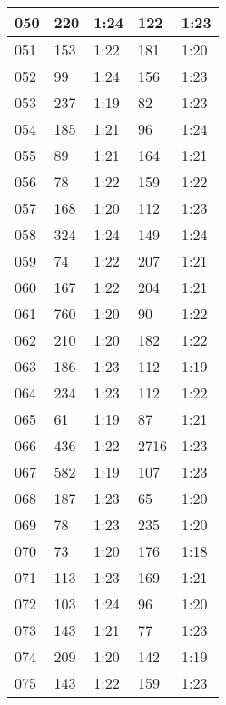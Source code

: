 \begin{center}
\begin{longtable}{|p{2cm}|l|l|l|l|}
050	&   220           &  1:24  &		122     	& 1:23 \\ \hline
051	&   153           &  1:22  &		181     	& 1:20 \\ \hline
052	&   99            &  1:24  &		156     	& 1:23 \\ \hline
053	&   237           &  1:19  &		82      	& 1:23 \\ \hline
054	&   185           &  1:21  &		96      	& 1:24 \\ \hline
055	&   89            &  1:21  &		164     	& 1:21 \\ \hline
056	&   78            &  1:22  &		159     	& 1:22 \\ \hline
057	&   168           &  1:20  &		112     	& 1:23 \\ \hline
058	&   324           &  1:24  &		149     	& 1:24 \\ \hline
059	&   74            &  1:22  &		207     	& 1:21 \\ \hline
060	&   167           &  1:22  &		204     	& 1:21 \\ \hline
061	&   760           &  1:20  &		90      	& 1:22 \\ \hline
062	&   210           &  1:20  &		182     	& 1:22 \\ \hline
063	&   186           &  1:23  &		112     	& 1:19 \\ \hline
064	&   234           &  1:23  &		112     	& 1:22 \\ \hline
065	&   61            &  1:19  &		87      	& 1:21 \\ \hline
066	&   436           &  1:22  &		2716     	& 1:23 \\ \hline
067	&   582           &  1:19  &		107     	& 1:23 \\ \hline
068	&   187           &  1:23  &		65      	& 1:20 \\ \hline
069	&   78            &  1:23  &		235     	& 1:20 \\ \hline
070	&   73            &  1:20  &		176     	& 1:18 \\ \hline
071	&   113           &  1:23  &		169     	& 1:21 \\ \hline
072	&   103           &  1:24  &		96      	& 1:20 \\ \hline
073	&   143           &  1:21  &		77      	& 1:23 \\ \hline
074	&   209           &  1:20  &		142     	& 1:19 \\ \hline
075	&   143           &  1:22  &		159     	& 1:23 \\ \hline

\end{longtable}
\end{center}
